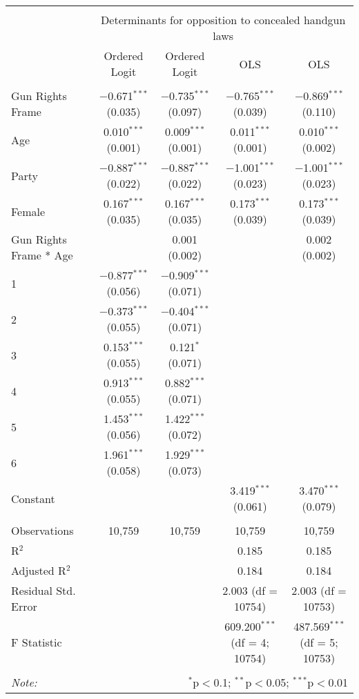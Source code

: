 
\begin{table}[!htbp] \centering 
  \caption{} 
  \label{} 
\begin{tabular}{@{\extracolsep{5pt}}lcccc} 
\\[-1.8ex]\hline 
\hline \\[-1.8ex] 
 & \multicolumn{4}{c}{Determinants for opposition to concealed handgun laws} \\ 
\cline{2-5} 
 & Ordered Logit & Ordered Logit & OLS & OLS \\ 
\hline \\[-1.8ex] 
 Gun Rights Frame & $-$0.671$^{***}$ (0.035) & $-$0.735$^{***}$ (0.097) & $-$0.765$^{***}$ (0.039) & $-$0.869$^{***}$ (0.110) \\ 
  Age & 0.010$^{***}$ (0.001) & 0.009$^{***}$ (0.001) & 0.011$^{***}$ (0.001) & 0.010$^{***}$ (0.002) \\ 
  Party & $-$0.887$^{***}$ (0.022) & $-$0.887$^{***}$ (0.022) & $-$1.001$^{***}$ (0.023) & $-$1.001$^{***}$ (0.023) \\ 
  Female & 0.167$^{***}$ (0.035) & 0.167$^{***}$ (0.035) & 0.173$^{***}$ (0.039) & 0.173$^{***}$ (0.039) \\ 
  Gun Rights Frame * Age &  & 0.001 (0.002) &  & 0.002 (0.002) \\ 
  1\textbar 2 & $-$0.877$^{***}$ (0.056) & $-$0.909$^{***}$ (0.071) &  &  \\ 
  2\textbar 3 & $-$0.373$^{***}$ (0.055) & $-$0.404$^{***}$ (0.071) &  &  \\ 
  3\textbar 4 & 0.153$^{***}$ (0.055) & 0.121$^{*}$ (0.071) &  &  \\ 
  4\textbar 5 & 0.913$^{***}$ (0.055) & 0.882$^{***}$ (0.071) &  &  \\ 
  5\textbar 6 & 1.453$^{***}$ (0.056) & 1.422$^{***}$ (0.072) &  &  \\ 
  6\textbar 7 & 1.961$^{***}$ (0.058) & 1.929$^{***}$ (0.073) &  &  \\ 
  Constant &  &  & 3.419$^{***}$ (0.061) & 3.470$^{***}$ (0.079) \\ 
 \hline \\[-1.8ex] 
Observations & 10,759 & 10,759 & 10,759 & 10,759 \\ 
R$^{2}$ &  &  & 0.185 & 0.185 \\ 
Adjusted R$^{2}$ &  &  & 0.184 & 0.184 \\ 
Residual Std. Error &  &  & 2.003 (df = 10754) & 2.003 (df = 10753) \\ 
F Statistic &  &  & 609.200$^{***}$ (df = 4; 10754) & 487.569$^{***}$ (df = 5; 10753) \\ 
\hline 
\hline \\[-1.8ex] 
\textit{Note:}  & \multicolumn{4}{r}{$^{*}$p$<$0.1; $^{**}$p$<$0.05; $^{***}$p$<$0.01} \\ 
\end{tabular} 
\end{table} 
